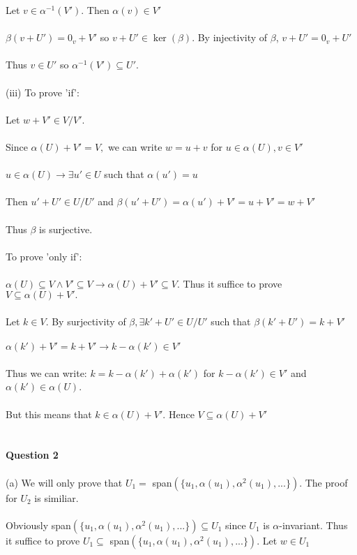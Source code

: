 \documentclass{article}
\begin{document}
Let $v\in\alpha^{-1}(V')$. Then $\alpha(v) \in V'$\\\\
$\beta(v+U') = 0_v + V'$ so $v+U'\in \ker(\beta)$. By injectivity of $\beta$,
$v + U' = 0_v + U'$\\\\Thus $v\in U'$ so $\alpha^{-1}(V') \subseteq U'$.\\\\
(iii) To prove 'if':\\\\
Let $w+V' \in V/V'$.\\\\Since $\alpha(U) + V' = V,$ we can write $w = u + v$ for $u\in \alpha(U), v \in V'$\\\\
$u\in\alpha(U) \to \exists u' \in U$ such that $ \alpha(u') = u$\\\\Then $u' + U' \in U/U'$ and $\beta(u'+U') = \alpha(u') + V' = u + V' = w + V'$ \\\\ Thus $\beta$ is surjective. \\\\
To prove 'only if':\\\\
$\alpha(U)\subseteq V \land V' \subseteq V \to \alpha(U) + V' \subseteq V$. Thus it suffice to prove $V\subseteq\alpha(U) + V'.$\\\\
Let $k\in V.$ By surjectivity of $\beta, \exists k'+U' \in U/U'$ such that $\beta(k'+U') = k + V'$\\\\
$\alpha(k') + V' = k + V' \to k-\alpha(k') \in V'$\\\\
Thus we can write: $k = k - \alpha(k') + \alpha(k')$ for $k-\alpha(k')\in V'$ and $\alpha(k')\in \alpha(U)$.\\\\
But this means that $k\in \alpha(U) + V'.$ Hence $V\subseteq \alpha(U) + V'$\\\\\\
\textbf{Question 2}\\\\
(a) We will only prove that $U_1 = $ span$(\{u_1,\alpha(u_1),\alpha^2(u_1),...\}).$ The proof for $U_2$ is similiar.\\\\
Obviously span$(\{u_1,\alpha(u_1),\alpha^2(u_1),...\}) \subseteq U_1$ since $U_1$ is $\alpha$-invariant. Thus it suffice to prove $U_1 \subseteq$ span$(\{u_1,\alpha(u_1),\alpha^2(u_1),...\})$. Let $w\in U_1$
\end{document}
